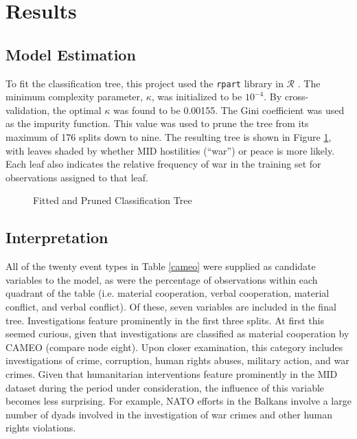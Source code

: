 \documentclass[12pt,letterpaper]{article} %
\begin{document}


\section{Results}

\subsection{Model Estimation}

To fit the classification tree, this project used the \texttt{rpart} library in $\mathcal{R}$ \citep{therneau1997introduction}. The minimum complexity parameter, $\kappa$, was initialized to be $10^{-4}$. By cross-validation, the optimal $\kappa$ was found to be 0.00155. The Gini coefficient was used as the impurity function. This value was used to prune the tree from its maximum of 176 splits down to nine. The resulting tree is shown in Figure \ref{tree}, with leaves shaded by whether MID hostilities (``war'') or peace is more likely. Each leaf also indicates the relative frequency of war in the training set for observations assigned to that leaf.


\begin{figure}[h!]
  \begin{center}
  \vspace{-1in}
    
  \vspace{-1in}
    \caption{Fitted and Pruned Classification Tree}
    \label{tree}
  \end{center}
\end{figure}

\subsection{Interpretation}

All of the twenty event types in Table \ref{cameo} were supplied as candidate variables to the model, as were the percentage of observations within each quadrant of the table (i.e. material cooperation, verbal cooperation, material conflict, and verbal conflict). Of these, seven variables are included in the final tree. Investigations feature prominently in the first three splits. At first this seemed curious, given that investigations are classified as material cooperation by CAMEO (compare node eight). Upon closer examination, this category includes investigations of crime, corruption, human rights abuses, military action, and war crimes. Given that humanitarian interventions feature prominently in the MID dataset during the period under consideration, the influence of this variable becomes less surprising. For example, NATO efforts in the Balkans involve a large number of dyads involved in the investigation of war crimes and other human rights violations. 
\end{document}
